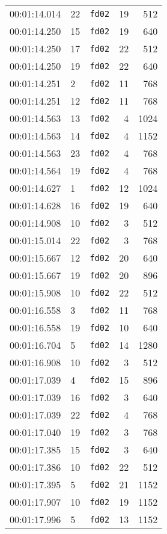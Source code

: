 \documentclass{article}
\begin{document}
\begin{longtable}{lllrr}
00:01:14.014 & 22 & \texttt{fd02} & 19 & 512 \\
00:01:14.250 & 15 & \texttt{fd02} & 19 & 640 \\
00:01:14.250 & 17 & \texttt{fd02} & 22 & 512 \\
00:01:14.250 & 19 & \texttt{fd02} & 22 & 640 \\
00:01:14.251 & 2 & \texttt{fd02} & 11 & 768 \\
00:01:14.251 & 12 & \texttt{fd02} & 11 & 768 \\
00:01:14.563 & 13 & \texttt{fd02} & 4 & 1024 \\
00:01:14.563 & 14 & \texttt{fd02} & 4 & 1152 \\
00:01:14.563 & 23 & \texttt{fd02} & 4 & 768 \\
00:01:14.564 & 19 & \texttt{fd02} & 4 & 768 \\
00:01:14.627 & 1 & \texttt{fd02} & 12 & 1024 \\
00:01:14.628 & 16 & \texttt{fd02} & 19 & 640 \\
00:01:14.908 & 10 & \texttt{fd02} & 3 & 512 \\
00:01:15.014 & 22 & \texttt{fd02} & 3 & 768 \\
00:01:15.667 & 12 & \texttt{fd02} & 20 & 640 \\
00:01:15.667 & 19 & \texttt{fd02} & 20 & 896 \\
00:01:15.908 & 10 & \texttt{fd02} & 22 & 512 \\
00:01:16.558 & 3 & \texttt{fd02} & 11 & 768 \\
00:01:16.558 & 19 & \texttt{fd02} & 10 & 640 \\
00:01:16.704 & 5 & \texttt{fd02} & 14 & 1280 \\
00:01:16.908 & 10 & \texttt{fd02} & 3 & 512 \\
00:01:17.039 & 4 & \texttt{fd02} & 15 & 896 \\
00:01:17.039 & 16 & \texttt{fd02} & 3 & 640 \\
00:01:17.039 & 22 & \texttt{fd02} & 4 & 768 \\
00:01:17.040 & 19 & \texttt{fd02} & 3 & 768 \\
00:01:17.385 & 15 & \texttt{fd02} & 3 & 640 \\
00:01:17.386 & 10 & \texttt{fd02} & 22 & 512 \\
00:01:17.395 & 5 & \texttt{fd02} & 21 & 1152 \\
00:01:17.907 & 10 & \texttt{fd02} & 19 & 1152 \\
00:01:17.996 & 5 & \texttt{fd02} & 13 & 1152 \\

\end{longtable}
\end{document}
